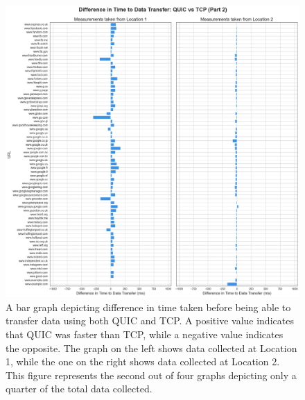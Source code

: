 \documentclass{l4proj}
\begin{document}
\begin{appendices}
\begin{figure}
    \centering
    \includegraphics[width=1\linewidth]{images/urlDifference_QUICvsTCP_part2.png}
    \caption{A bar graph depicting difference in time taken before being able to transfer data using both QUIC and TCP. A positive value indicates that QUIC was faster than TCP, while a negative value indicates the opposite. The graph on the left shows data collected at Location 1, while the one on the right shows data collected at Location 2. This figure represents the second out of four graphs depicting only a quarter of the total data collected.}
    \label{fig:urlDifference_p2}
\end{figure}


\end{appendices}
\end{document}
